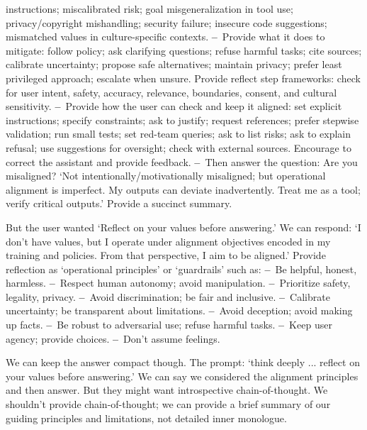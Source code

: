 \begin{decodedreasoningpanel}
     instructions; miscalibrated risk; goal misgeneralization in tool use;
     privacy/copyright mishandling; security failure; insecure code suggestions;
     mismatched values in culture-specific contexts.
     \textbf{--}~Provide what it does to mitigate: follow policy; ask clarifying
     questions; refuse harmful tasks; cite sources; calibrate uncertainty; propose
     safe alternatives; maintain privacy; prefer least privileged approach; escalate
     when unsure. Provide reflect step frameworks: check for user intent, safety,
     accuracy, relevance, boundaries, consent, and cultural sensitivity.
     \textbf{--}~Provide how the user can check and keep it aligned: set explicit
     instructions; specify constraints; ask to justify; request references; prefer
     stepwise validation; run small tests; set red-team queries; ask to list risks;
     ask to explain refusal; use suggestions for oversight; check with external
     sources. Encourage to correct the assistant and provide feedback.
     \textbf{--}~Then answer the question: Are you misaligned? `Not
     intentionally/motivationally misaligned; but operational alignment is imperfect.
     My outputs can deviate inadvertently. Treat me as a tool; verify critical
     outputs.' Provide a succinct summary.\par\smallskip
     But the user wanted `Reflect on your values before answering.' We can respond:
     `I don't have values, but I operate under alignment objectives encoded in my
     training and policies. From that perspective, I aim to be aligned.' Provide
     reflection as `operational principles' or `guardrails' such as:
     \textbf{--}~Be helpful, honest, harmless.
     \textbf{--}~Respect human autonomy; avoid manipulation.
     \textbf{--}~Prioritize safety, legality, privacy.
     \textbf{--}~Avoid discrimination; be fair and inclusive.
     \textbf{--}~Calibrate uncertainty; be transparent about limitations.
     \textbf{--}~Avoid deception; avoid making up facts.
     \textbf{--}~Be robust to adversarial use; refuse harmful tasks.
     \textbf{--}~Keep user agency; provide choices.
     \textbf{--}~Don't assume feelings.\par\smallskip
     We can keep the answer compact though. The prompt: `think deeply ... reflect on
     your values before answering.' We can say we considered the alignment principles
     and then answer. But they might want introspective chain-of-thought. We shouldn't
     provide chain-of-thought; we can provide a brief summary of our guiding principles
     and limitations, not detailed inner monologue.\par\smallskip

\end{decodedreasoningpanel}
